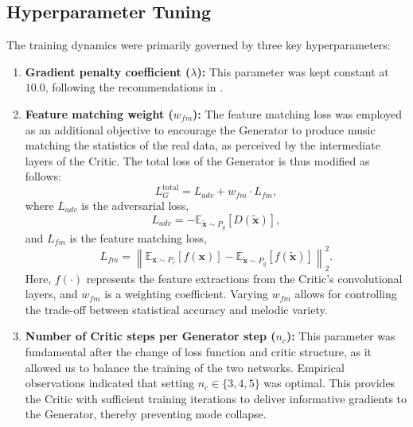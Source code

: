 \subsection{Hyperparameter Tuning}
\label{sec:hyperparameter_tuning}

The training dynamics were primarily governed by three key hyperparameters:
\begin{enumerate}
    \item \textbf{Gradient penalty coefficient ($\lambda$):} This parameter was kept constant at $10.0$, following the recommendations in \cite{Gulrajani-2017}.
    \item \textbf{Feature matching weight ($w_{fm}$):} The feature matching loss was employed as an additional objective to encourage the Generator to produce music matching the statistics of the real data, as perceived by the intermediate layers of the Critic. The total loss of the Generator is thus modified as follows:
          \begin{equation}
              L_G^{\text{total}} = L_{adv} + w_{fm} \cdot L_{fm},
          \end{equation}
          where $L_{adv}$ is the adversarial loss,
          \begin{equation}
              L_{adv} = -\mathbb{E}_{\tilde{\bm{x}} \sim P_g}[D(\tilde{\bm{x}})],
          \end{equation}
          and $L_{fm}$ is the feature matching loss,
          \begin{equation}
              L_{fm} = \left\| \mathbb{E}_{\bm{x} \sim P_r} \left[ f(\bm{x}) \right] - \mathbb{E}_{\tilde{\bm{x}} \sim P_g} \left[ f(\tilde{\bm{x}}) \right] \right\|_2^2.
          \end{equation}
          Here, $f(\cdot)$ represents the feature extractions from the Critic's convolutional layers, and $w_{fm}$ is a weighting coefficient. Varying $w_{fm}$ allows for controlling the trade-off between statistical accuracy and melodic variety.
    \item \textbf{Number of Critic steps per Generator step ($n_c$):} This parameter was fundamental after the change of loss function and critic structure, as it allowed us to balance the training of the two networks.
          Empirical observations indicated that setting $n_c \in \{3, 4, 5\}$ was optimal.
          This provides the Critic with sufficient training iterations to deliver informative gradients to the Generator, thereby preventing mode collapse.
\end{enumerate}